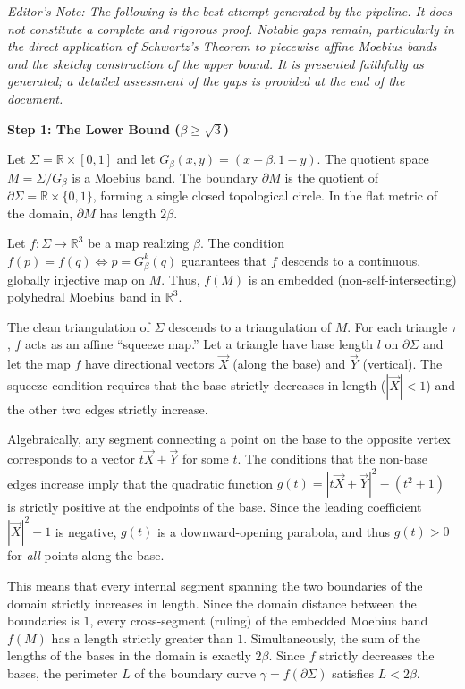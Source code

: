 \documentclass[12pt]{article}
\begin{document}
\textit{Editor's Note: The following is the best attempt generated by the pipeline. It does not constitute a complete and rigorous proof. Notable gaps remain, particularly in the direct application of Schwartz's Theorem to piecewise affine Moebius bands and the sketchy construction of the upper bound. It is presented faithfully as generated; a detailed assessment of the gaps is provided at the end of the document.}

\vspace{1em}

\noindent\textbf{Step 1: The Lower Bound ($\beta \ge \sqrt{3}$)}

\vspace{0.5em}

Let $\Sigma = \mathbb{R} \times [0,1]$ and let $G_{\beta}(x,y) = (x+\beta, 1-y)$. The quotient space $M = \Sigma / G_{\beta}$ is a Moebius band. The boundary $\partial M$ is the quotient of $\partial \Sigma = \mathbb{R} \times \{0,1\}$, forming a single closed topological circle. In the flat metric of the domain, $\partial M$ has length $2\beta$.

Let $f: \Sigma \to \mathbb{R}^3$ be a map realizing $\beta$. The condition $f(p)=f(q) \iff p = G_{\beta}^k(q)$ guarantees that $f$ descends to a continuous, globally injective map on $M$. Thus, $f(M)$ is an embedded (non-self-intersecting) polyhedral Moebius band in $\mathbb{R}^3$. 

The clean triangulation of $\Sigma$ descends to a triangulation of $M$. For each triangle $\tau$, $f$ acts as an affine ``squeeze map.'' Let a triangle have base length $l$ on $\partial \Sigma$ and let the map $f$ have directional vectors $\vec{X}$ (along the base) and $\vec{Y}$ (vertical). The squeeze condition requires that the base strictly decreases in length ($|\vec{X}| < 1$) and the other two edges strictly increase. 

Algebraically, any segment connecting a point on the base to the opposite vertex corresponds to a vector $t \vec{X} + \vec{Y}$ for some $t$. The conditions that the non-base edges increase imply that the quadratic function $g(t) = |t \vec{X} + \vec{Y}|^2 - (t^2 + 1)$ is strictly positive at the endpoints of the base. Since the leading coefficient $|\vec{X}|^2 - 1$ is negative, $g(t)$ is a downward-opening parabola, and thus $g(t) > 0$ for \emph{all} points along the base. 

This means that every internal segment spanning the two boundaries of the domain strictly increases in length. Since the domain distance between the boundaries is $1$, every cross-segment (ruling) of the embedded Moebius band $f(M)$ has a length strictly greater than $1$. 
Simultaneously, the sum of the lengths of the bases in the domain is exactly $2\beta$. Since $f$ strictly decreases the bases, the perimeter $L$ of the boundary curve $\gamma = f(\partial \Sigma)$ satisfies $L < 2\beta$.
\end{document}
